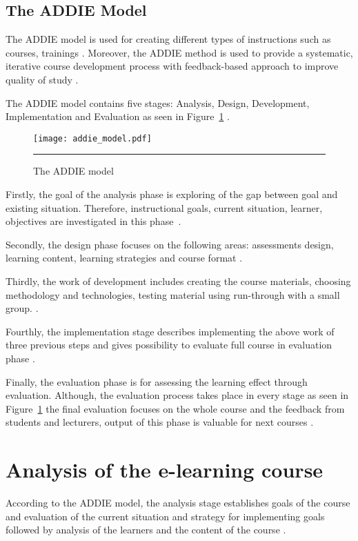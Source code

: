 \subsection{The ADDIE Model}

The \gls{ADDIE} model is used for creating different types of instructions such as courses, trainings \citep{website:addie, lohr1998using}. Moreover, the ADDIE method is  used to provide a systematic, iterative course development process with feedback-based approach to improve quality of study \citep{website:using_addie}.

The ADDIE model contains five stages: Analysis, Design, Development, Implementation and Evaluation as seen in Figure~\ref{figure:the addie model} \citep{website:addie}.


\begin{figure}[H]
 \centering 
 \texttt{[image: addie\_model.pdf]}
 \rule{35em}{0.5pt} 
 \caption{The ADDIE model} 
 \label{figure:the addie model} 
\end{figure}

Firstly, the goal of the analysis phase is exploring of the gap between goal and existing situation. Therefore, instructional goals, current situation, learner, objectives are investigated in this phase~\citep{chen2007learning, website:addie}.

Secondly, the design phase focuses on the following areas: assessments design, learning content, learning strategies and course format \citep{chen2007learning, website:addie}.


Thirdly, the work of development includes creating the course materials, choosing methodology and technologies, testing material using run-through with a small group. \citep{OppeArenduskeskus2010, website:addie, chen2007learning}.


Fourthly, the implementation stage describes implementing the above work of three previous steps and gives possibility to evaluate full course in evaluation phase \citep{chen2007learning, website:addie}.


Finally, the evaluation phase is for assessing the learning effect through evaluation. Although, the evaluation process takes place in every stage as seen in Figure~\ref{figure:the addie model} the final evaluation focuses on the whole course and the feedback from students and lecturers, output of this phase is valuable for next courses \citep{OppeArenduskeskus2010, website:addie}.

\section{Analysis of the e-learning course}
According to the \gls{ADDIE} model, the analysis stage establishes goals of the course and evaluation of the current situation and strategy for implementing goals followed by analysis of the learners and the content of the course \citep{website:addie}.


